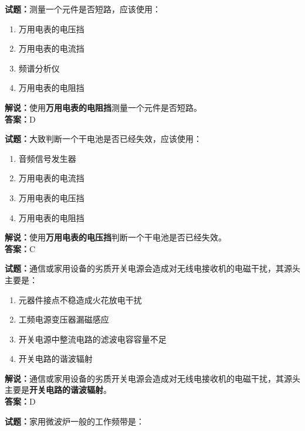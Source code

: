 \documentclass{ctexbook}
\begin{document}
\noindent\textbf{试题：}测量一个元件是否短路，应该使用：

\begin{enumerate}[leftmargin=3em]
  \item 万用电表的电压挡
  \item 万用电表的电流挡
  \item 频谱分析仪
  \item 万用电表的电阻挡
\end{enumerate}

\noindent\textbf{解说：}使用\textbf{万用电表的电阻挡}测量一个元件是否短路。\\\noindent\textbf{答案：}D

\vspace{\baselineskip}

\noindent\textbf{试题：}大致判断一个干电池是否已经失效，应该使用：

\begin{enumerate}[leftmargin=3em]
  \item 音频信号发生器
  \item 万用电表的电流挡
  \item 万用电表的电压挡
  \item 万用电表的电阻挡
\end{enumerate}

\noindent\textbf{解说：}使用\textbf{万用电表的电压挡}判断一个干电池是否已经失效。\\\noindent\textbf{答案：}C

\vspace{\baselineskip}

\noindent\textbf{试题：}通信或家用设备的劣质开关电源会造成对无线电接收机的电磁干扰，其源头主要是：

\begin{enumerate}[leftmargin=3em]
  \item 元器件接点不稳造成火花放电干扰
  \item 工频电源变压器漏磁感应
  \item 开关电源中整流电路的滤波电容容量不足
  \item 开关电路的谐波辐射
\end{enumerate}

\noindent\textbf{解说：}通信或家用设备的劣质开关电源会造成对无线电接收机的电磁干扰，其源头主要是\textbf{开关电路的谐波辐射}。\\\noindent\textbf{答案：}D

\vspace{\baselineskip}

\noindent\textbf{试题：}家用微波炉一般的工作频带是：
\end{document}
